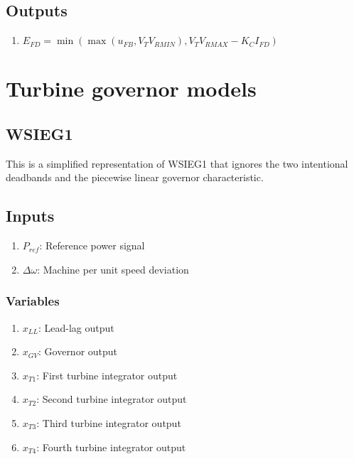 \documentclass[12pt]{article}
\newcommand{\dw}{\Delta\omega}
\begin{document}
\subsection{Outputs}
\begin{enumerate}
  \item $E_{FD} = \min(\max(u_{FB},V_TV_{RMIN}),V_TV_{RMAX} - K_CI_{FD})$
\end{enumerate}

\section{Turbine governor models}

\subsection{WSIEG1}
This is a simplified representation of WSIEG1 that ignores the two intentional deadbands and the piecewise linear governor characteristic.

\subsection{Inputs}
\begin{enumerate}
  \item $P_{ref}$: Reference power signal
  \item $\dw$: Machine per unit speed deviation
\end{enumerate}

\subsubsection{Variables}
\begin{enumerate}
  \item $x_{LL}$: Lead-lag output
  \item $x_{GV}$: Governor output
  \item $x_{T1}$: First turbine integrator output
  \item $x_{T2}$: Second turbine integrator output
  \item $x_{T3}$: Third turbine integrator output
  \item $x_{T4}$: Fourth turbine integrator output
\end{enumerate}
\end{document}
